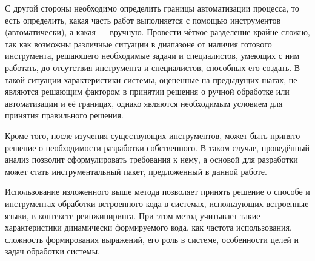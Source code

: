 \begin{enumerate}
  С другой стороны необходимо определить границы автоматизации процесса, то есть определить, какая часть работ выполняется с помощью инструментов (автоматически), а какая --- вручную. Провести чёткое разделение крайне сложно, так как возможны различные ситуации в диапазоне от наличия готового инструмента, решающего необходимые задачи и специалистов, умеющих с ним работать, до отсутствия инструмента и специалистов, способных его создать. В такой ситуации характеристики системы, оцененные на предыдущих шагах, не являются решающим фактором в принятии решения о ручной обработке или автоматизации и её границах, однако являются необходимым условием для принятия правильного решения.
  
  Кроме того, после изучения существующих инструментов, может быть  принято решение о необходимости разработки собственного. В таком случае, проведённый анализ позволит сформулировать требования к нему, а основой для разработки может стать инструментальный пакет, предложенный в данной работе.
  
\end{enumerate}

Использование изложенного выше метода позволяет принять решение о способе и инструментах обработки встроенного кода в системах, использующих встроенные языки, в контексте реинжиниринга. При этом метод учитывает такие характеристики динамически формируемого кода, как частота использования, сложность формирования выражений, его роль в системе, особенности целей и задач обработки системы.


\clearpage
